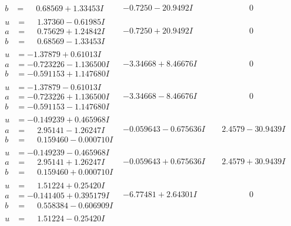 \documentclass[1p]{elsarticle_modified}
\theoremstyle{definition}
\begin{document}
$$\begin{array}{c|c|c}
\begin{aligned}
b &= \phantom{-}0.68569 + 1.33453 I\end{aligned}
 & -0.7250 - 20.9492 I & \phantom{-0.000000 } 0 \\ \hline\begin{aligned}
u &= \phantom{-}1.37360 - 0.61985 I \\
a &= \phantom{-}0.75629 + 1.24842 I \\
b &= \phantom{-}0.68569 - 1.33453 I\end{aligned}
 & -0.7250 + 20.9492 I & \phantom{-0.000000 } 0 \\ \hline\begin{aligned}
u &= -1.37879 + 0.61013 I \\
a &= -0.723226 - 1.136500 I \\
b &= -0.591153 + 1.147680 I\end{aligned}
 & -3.34668 + 8.46676 I & \phantom{-0.000000 } 0 \\ \hline\begin{aligned}
u &= -1.37879 - 0.61013 I \\
a &= -0.723226 + 1.136500 I \\
b &= -0.591153 - 1.147680 I\end{aligned}
 & -3.34668 - 8.46676 I & \phantom{-0.000000 } 0 \\ \hline\begin{aligned}
u &= -0.149239 + 0.465968 I \\
a &= \phantom{-}2.95141 - 1.26247 I \\
b &= \phantom{-}0.159460 - 0.000710 I\end{aligned}
 & -0.059643 - 0.675636 I & \phantom{-}2.4579 - 30.9439 I \\ \hline\begin{aligned}
u &= -0.149239 - 0.465968 I \\
a &= \phantom{-}2.95141 + 1.26247 I \\
b &= \phantom{-}0.159460 + 0.000710 I\end{aligned}
 & -0.059643 + 0.675636 I & \phantom{-}2.4579 + 30.9439 I \\ \hline\begin{aligned}
u &= \phantom{-}1.51224 + 0.25420 I \\
a &= -0.141405 + 0.395179 I \\
b &= \phantom{-}0.558384 - 0.606909 I\end{aligned}
 & -6.77481 + 2.64301 I & \phantom{-0.000000 } 0 \\ \hline\begin{aligned}
u &= \phantom{-}1.51224 - 0.25420 I \\

\end{aligned}
\end{array}$$
\end{document}
